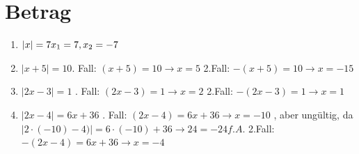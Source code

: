 \section{Betrag}
\begin{enumerate}
\item $|x| = 7\\
	  x_1=7, x_2= -7$
\item $|x + 5| = 10$. Fall:\newline
		$(x+5) = 10 \rightarrow x=5$ \newline
		2.Fall:  \newline
		$-(x+5)=10 \rightarrow x=-15$

\item $|2x - 3| = 1$ . Fall:\newline
		$(2x-3) = 1 \rightarrow x=2$ \newline
		2.Fall:  \newline
		$-(2x-3)=1 \rightarrow x=1$
\item $|2x - 4| = 6x + 36$ . Fall:\newline
		$(2x-4) = 6x+36 \rightarrow x=-10 $ , aber ung\"ultig, da $ |2 \cdot (-10) -4)| = 6 \cdot (-10) + 36 \rightarrow 24 = -24 f.A. $\newline
		2.Fall:  \newline
		$-(2x-4)=6x+36 \rightarrow x=-4$
\end{enumerate}

